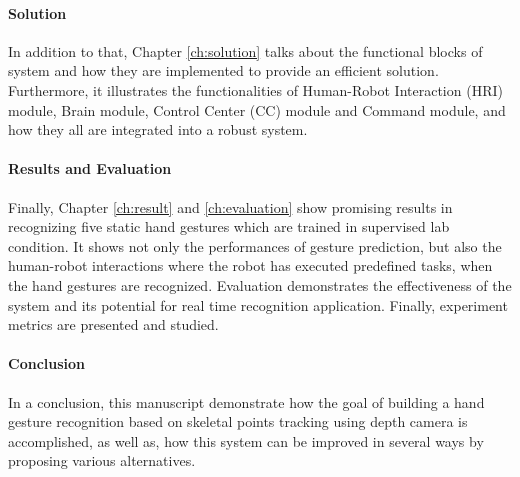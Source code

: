 \paragraph*{Solution} In addition to that, Chapter \ref{ch:solution} talks about the functional blocks of system and how they are implemented to provide an efficient solution. Furthermore, it illustrates the functionalities of Human-Robot Interaction (HRI) module, Brain module, Control Center (CC) module and Command module, and how they all are integrated into a robust system.

\paragraph*{Results and Evaluation} Finally, Chapter \ref{ch:result} and \ref{ch:evaluation} show promising results in recognizing five static hand gestures which are trained in supervised lab condition. It shows not only the performances of gesture prediction, but also the human-robot interactions where the robot has executed predefined tasks, when the hand gestures are recognized. Evaluation demonstrates the effectiveness of the system and its potential for real time recognition application. Finally, experiment metrics are presented and studied.

\paragraph*{Conclusion} In a conclusion, this manuscript demonstrate how the goal of building a hand gesture recognition based on skeletal points tracking using depth camera is accomplished, as well as, how this system can be improved in several ways by proposing various alternatives.
